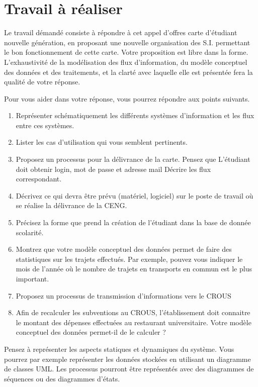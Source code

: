\documentclass[12pt]{article}
\begin{document}
\section{Travail à réaliser}

\noindent
Le travail démandé consiste à répondre à cet appel d'offres carte 
d'étudiant nouvelle génération, en proposant une nouvelle organisation des S.I. 
permettant le bon fonctionnement de cette carte. 
Votre proposition est libre dans la forme. 
L'exhaustivité de la modélisation des flux d'information, du modèle conceptuel 
des données et des traitements, et la clarté avec laquelle elle est présentée 
fera la qualité de votre réponse.

Pour vous aider dans votre réponse, vous pourrez répondre aux points suivants.

\begin{enumerate}
\item  Représenter schématiquement les différents systèmes d'information et les flux entre ces systèmes.
\item  Lister les cas d'utilisation qui vous semblent pertinents.
\item  Proposez un processus pour la délivrance de la carte.
      Pensez que L'étudiant doit obtenir login, mot de passe et adresse mail
 Décrire les flux correspondant. 

\item Décrivez ce qui devra être prévu (matériel, logiciel) sur le poste de travail où se réalise
la délivrance de la CENG.

\item  Précisez la forme que prend la création de l'étudiant dans la base de donnée scolarité.
\item  Montrez que votre modèle conceptuel des données permet de faire des statistiques sur les trajets effectués. 
	 Par exemple, pouvez vous indiquer le mois de l'année où le nombre de trajets en transports en commun est
	le plus important.
\item  Proposez un processus de transmission d'informations vers le CROUS
\item  Afin de recalculer les subventions au CROUS, l'établissement doit connaitre
le montant des dépenses effectuées au restaurant universitaire. Votre modèle conceptuel des données permet-il
de le calculer ?
\end{enumerate}

Pensez à représenter les aspects statiques et dynamiques du système. Vous 
pourrez par exemple représenter les données stockées en utilisant un diagramme de 
classes UML. Les processus pourront être représentés avec des diagrammes
de séquences ou des diagrammes d'états.
\end{document}
